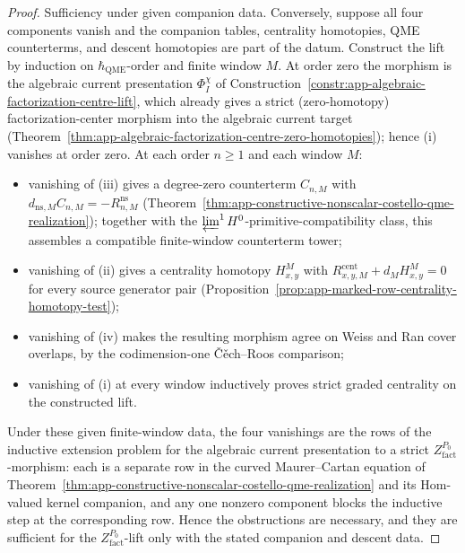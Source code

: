 \begin{proof}
  Sufficiency under given companion data.  Conversely, suppose all
  four components vanish and the companion tables, centrality
  homotopies, QME counterterms, and descent homotopies are part of the
  datum.  Construct the lift by induction on \(\hbar_{\mathrm{QME}}\)-order
  and finite window \(M\).  At order zero the morphism is the
  algebraic current presentation \(\Phi_I^\chi\) of
  Construction~\ref{constr:app-algebraic-factorization-centre-lift},
  which already gives a strict (zero-homotopy)
  factorization-center morphism into the algebraic current target
  (Theorem~\ref{thm:app-algebraic-factorization-centre-zero-homotopies});
  hence (i) vanishes at order zero.  At each order \(n\geq1\) and
  each window \(M\):
  \begin{itemize}
    \item vanishing of (iii) gives a degree-zero counterterm
      \(C_{n,M}\) with
      \(d_{\mathrm{ns},M}C_{n,M}=-R^{\mathrm{ns}}_{n,M}\)
      (Theorem~\ref{thm:app-constructive-nonscalar-costello-qme-realization});
      together with the \(\varprojlim^1H^0\)-primitive-compatibility
      class, this assembles a compatible finite-window counterterm tower;
    \item vanishing of (ii) gives a centrality homotopy
      \(H^M_{x,y}\) with
      \(R^{\mathrm{cent}}_{x,y,M}+d_M H^M_{x,y}=0\) for every source
      generator pair (Proposition~\ref{prop:app-marked-row-centrality-homotopy-test});
    \item vanishing of (iv) makes the resulting morphism agree on
      Weiss and Ran cover overlaps, by the codimension-one
      Č\v{e}ch--Roos comparison;
    \item vanishing of (i) at every window inductively proves
      strict graded centrality on the constructed lift.
  \end{itemize}
  Under these given finite-window data, the four vanishings are the
  rows of the inductive extension problem for the algebraic current
  presentation to a strict \(Z^{P_0}_{\mathrm{fact}}\)-morphism: each is a separate row in
  the curved Maurer--Cartan equation of
  Theorem~\ref{thm:app-constructive-nonscalar-costello-qme-realization}
  and its Hom-valued kernel companion, and any one nonzero
  component blocks the inductive step at the corresponding row.
  Hence the obstructions are necessary, and they are sufficient for the
  \(Z^{P_0}_{\mathrm{fact}}\)-lift only with the stated companion and
  descent data.


\end{proof}
